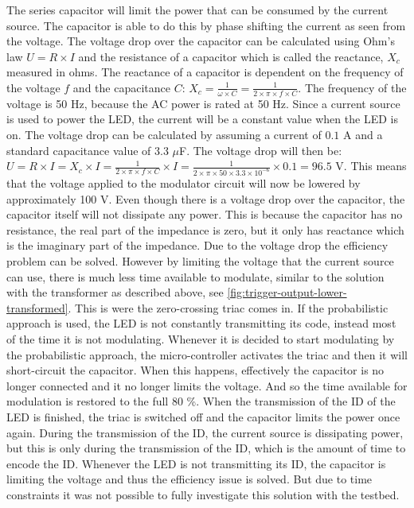 	The series capacitor will limit the power that can be consumed by the current source.
	The capacitor is able to do this by phase shifting the current as seen from the voltage.
	The voltage drop over the capacitor can be calculated using Ohm's law $U = R \times I$ and the resistance of a capacitor which is called the reactance, $X_c$ measured in ohms.
	The reactance of a capacitor is dependent on the frequency of the voltage $f$ and the capacitance $C$: $X_c = \frac{1}{\omega \times C} = \frac{1}{2 \times \pi \times f \times C}$.
	The frequency of the voltage is 50 Hz, because the AC power is rated at 50 Hz.
	Since a current source is used to power the LED, the current will be a constant value when the LED is on.
	The voltage drop can be calculated by assuming a current of $0.1$ A and a standard capacitance value of 3.3 $\mu$F.
	The voltage drop will then be: $U = R \times I = X_c \times I = \frac{1}{2 \times \pi \times f \times C} \times I = \frac{1}{2 \times \pi \times 50 \times 3.3 \times 10^{-6}} \times 0.1 = 96.5$ V.
	This means that the voltage applied to the modulator circuit will now be lowered by approximately 100 V.
	Even though there is a voltage drop over the capacitor, the capacitor itself will not dissipate any power.
	This is because the capacitor has no resistance, the real part of the impedance is zero, but it only has reactance which is the imaginary part of the impedance.
	Due to the voltage drop the efficiency problem can be solved.
	However by limiting the voltage that the current source can use, there is much less time available to modulate, similar to the solution with the transformer as described above, see \autoref{fig:trigger-output-lower-transformed}.
	This is were the zero-crossing triac comes in.
	If the probabilistic approach is used, the LED is not constantly transmitting its code, instead most of the time it is not modulating.
	Whenever it is decided to start modulating by the probabilistic approach, the micro-controller activates the triac and then it will short-circuit the capacitor.
	When this happens, effectively the capacitor is no longer connected and it no longer limits the voltage.
	And so the time available for modulation is restored to the full 80 \%.
	When the transmission of the ID of the LED is finished, the triac is switched off and the capacitor limits the power once again.
	During the transmission of the ID, the current source is dissipating power, but this is only during the transmission of the ID, which is the amount of time to encode the ID.
	Whenever the LED is not transmitting its ID, the capacitor is limiting the voltage and thus the efficiency issue is solved.
	But due to time constraints it was not possible to fully investigate this solution with the testbed.	


